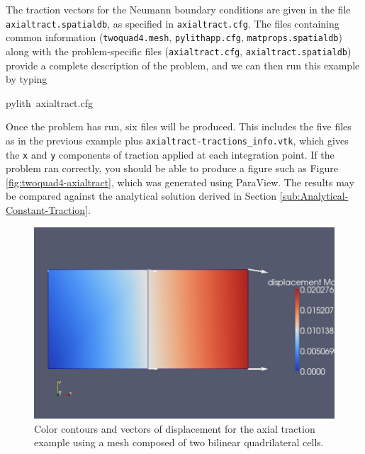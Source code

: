 The traction vectors for the Neumann boundary conditions are given
in the file \texttt{axialtract.spatialdb}, as specified in \texttt{axialtract.cfg}.
The files containing common information (\texttt{twoquad4.mesh}, \texttt{pylithapp.cfg},
\texttt{matprops.spatialdb}) along with the problem-specific files
(\texttt{axialtract.cfg}, \texttt{axialtract.spatialdb}) provide a
complete description of the problem, and we can then run this example
by typing
\begin{lyxcode}
pylith~axialtract.cfg
\end{lyxcode}
Once the problem has run, six files will be produced. This includes
the five files as in the previous example plus \texttt{axialtract-tractions\_info.vtk},
which gives the \texttt{x} and \texttt{y} components of traction applied
at each integration point. If the problem ran correctly, you should
be able to produce a figure such as Figure \vref{fig:twoquad4-axialtract},
which was generated using ParaView. The results may be compared against
the analytical solution derived in Section \ref{sub:Analytical-Constant-Traction}.

\begin{figure}
\begin{centering}
\includegraphics[scale=0.33]{tutorials/twocells/figs/twoquad4-axialtract}
\par\end{centering}

\caption{Color contours and vectors of displacement for the axial traction
example using a mesh composed of two bilinear quadrilateral cells.\label{fig:twoquad4-axialtract}}
\end{figure}

